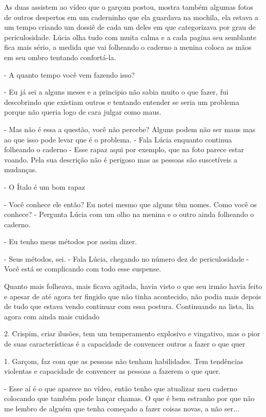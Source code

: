 As duas assistem ao vídeo que o garçom postou, mostra também algumas fotos de outros despertos em um caderninho que ela guardava na mochila, ela estava a um tempo criando um dossiê de cada um deles em que categorizava por grau de periculosidade. Lúcia olha tudo com  muita calma e a cada pagina seu semblante fica mais sério, a medida que vai folheando o caderno a menina coloca as mãos em seu ombro tentando confortá-la.

- A quanto tempo você vem fazendo isso?

- Eu já sei a alguns meses e a principio não sabia muito o que fazer, fui descobrindo que existiam outros e tentando entender se seria um problema porque não queria logo de cara julgar como maus.

- Mas não é essa a questão, você não percebe? Alguns podem não ser maus mas ao que isso pode levar que é o problema. - Fala Lúcia enquanto continua folheando o caderno - Esse rapaz aqui por exemplo, que na foto parece estar voando. Pela sua descrição não é perigoso mas as pessoas são suscetíveis a mudanças.

- O Ítalo é um bom rapaz

- Você conhece ele então? Eu notei mesmo que alguns têm nomes. Como você os conhece? - Pergunta Lúcia com um olho na menina e o outro ainda folheando o caderno.

- Eu tenho meus métodos por assim dizer.

- Seus métodos, sei. - Fala Lúcia, chegando no número dez de periculosidade - Você está se complicando com todo esse suspense.


Quanto mais folheava, mais ficava agitada, havia visto o que seu irmão havia feito e apesar de até agora ter fingido que não tinha acontecido, não podia mais depois de tudo que estava vendo continuar com essa postura.
Continuando na lista, lia agora com ainda mais cuidado

2. Crispim, criar ilusões, tem um temperamento explosivo e vingativo, mas o pior de suas  características é a capacidade de convencer outros a fazer o que quer

1. Garçom, faz com que as pessoas não tenham habilidades. Tem tendências violentas e capacidade de convencer as pessoas a fazerem o que quer.

- Esse aí é o que aparece no vídeo, então tenho que atualizar meu caderno colocando que também pode lançar chamas. O que é bem estranho por que não me lembro de alguém que tenha começado a fazer coisas novas, a não ser...


